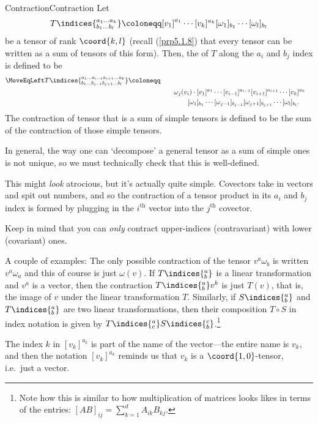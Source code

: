 \begin{dfn}{Contraction}{Contraction}
Let
\begin{equation}
T\indices{^{a_1\ldots a_k}_{b_1\ldots b_l}}\coloneqq [v_1]^{a_1}\cdots [v_k]^{a_k}[\omega _1]_{b_1}\cdots [\omega _l]_{b_l}
\end{equation}
be a tensor of rank $\coord{k,l}$ (recall (\cref{prp5.1.8}) that every tensor can be written as a sum of tensors of this form).  Then, the  of $T$ along the $a_i$ and $b_j$ index is defined to be
\begin{equation*}
\begin{split}
\MoveEqLeft
T\indices{^{a_1\ldots a_{i-1}a_{i+1}\ldots a_k}_{b_1\ldots b_{j-1}b_{j+1}\ldots b_l}}\coloneqq \\ 
& \qquad \omega _j(v_i)\cdot [v_1]^{a_1}\cdots [v_{i-1}]^{a_{i-1}}[v_{i+1}]^{a_{i+1}}\cdots [v_k]^{a_k} \\ & \qquad \qquad [\omega _1]_{b_1}\cdots [\omega _{j-1}]_{b_{j-1}}[\omega _{j+1}]_{b_{j+1}}\cdots [\omega _l]_{b_l}.
\end{split}
\end{equation*}
The contraction of tensor that is a sum of simple tensors is defined to be the sum of the contraction of those simple tensors.
\begin{rmk}
In general, the way one can `decompose' a general tensor as a sum of simple ones is not unique, so we must technically check that this is well-defined.
\end{rmk}
\begin{rmk}
This might \emph{look} atrocious, but it's actually quite simple.  Covectors take in vectors and spit out numbers, and so the contraction of a tensor product in its $a_i$ and $b_j$ index is formed by plugging in the $i^{\text{th}}$ vector into the $j^{\text{th}}$ covector.
\end{rmk}
\begin{rmk}
Keep in mind that you can \emph{only} contract upper-indices (contravariant) with lower (covariant) ones.
\end{rmk}
\begin{rmk}
A couple of examples:  The only possible contraction of the tensor $v^a\omega _b$ is written $v^a\omega _a$ and this of course is just $\omega (v)$.  If $T\indices{^a_b}$ is a linear transformation and $v^a$ is a vector, then the contraction $T\indices{^a_b}v^b$ is just $T(v)$, that is, the image of $v$ under the linear transformation $T$.  Similarly, if $S\indices{^a_b}$ and $T\indices{^a_b}$ are two linear transformations, then their composition $T\circ S$ in index notation is given by $T\indices{^a_c}S\indices{^c_b}$.\footnote{Note how this is similar to how multiplication of matrices looks likes in terms of the entries:  $[AB]_{ij}=\sum _{k=1}^dA_{ik}B_{kj}$.}
\end{rmk}
\begin{rmk}
The index $k$ in $[v_k]^{a_k}$ is part of the name of the vector---the entire name is $v_k$, and then the notation $[v_k]^{a_k}$ reminds us that $v_k$ is a $\coord{1,0}$-tensor, i.e.~just a vector.
\end{rmk}
\end{dfn}
